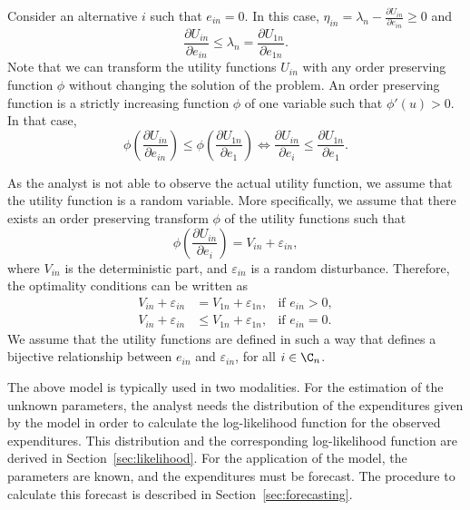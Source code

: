 \documentclass[12pt,a4paper]{article}
\begin{document}
Consider an alternative $i$ such that $e_{in} = 0$. In this case, $\eta_{in}=  \lambda_n- \frac{\partial U_{in}}{\partial e_{in}} \geq 0$ and
\begin{equation}
\label{eq:unchosen}
\frac{\partial U_{in}}{\partial e_{in}}  \leq \lambda_n = \frac{\partial U_{1n}}{\partial e_{1n}}.
\end{equation}
Note that we can transform the utility functions $U_{in}$ with any order preserving function $\phi$
without changing the solution of the problem. An order preserving function is a strictly increasing
function $\phi$ of one variable such that $\phi'(u) > 0$. In that case,
\begin{equation}
\label{eq:phi_transform}
\phi\left(\frac{\partial U_{in}}{\partial e_{in}}\right) \leq \phi\left(\frac{\partial U_{1n}}{\partial e_1}\right) \Longleftrightarrow
\frac{\partial U_{in}}{\partial e_i}  \leq \frac{\partial U_{1n}}{\partial e_1}.
\end{equation}

As the analyst is not able to observe the actual utility function, we  assume that the utility function is a random variable.
More specifically, we assume that there exists an order preserving transform $\phi$ of the utility functions such that
\begin{equation}
\label{eq:utility_def}
\phi\left(\frac{\partial U_{in}}{\partial e_i}\right) = V_{in} + \varepsilon_{in},
\end{equation}
where $V_{in}$ is the deterministic part, and $\varepsilon_{in}$ is a random disturbance. Therefore, the optimality conditions can be written as
\begin{align}
V_{in} + \varepsilon_{in}  &= V_{1n} + \varepsilon_{1n},  & \text{if } e_{in} > 0, \label{eq:non_zero}\\
V_{in} + \varepsilon_{in}  &\leq V_{1n} + \varepsilon_{1n},  & \text{if } e_{in} = 0. \label{eq:zero}
\end{align}
We assume that the utility functions are defined in such a way that
 defines a bijective relationship between $e_{in}$ and
$\varepsilon_{in}$, for all $i\in\C_n$.

The above model is typically used in two modalities. For the estimation of the unknown parameters, the analyst needs
the distribution of the expenditures given by the model in order to calculate the log-likelihood function
for the observed expenditures. This distribution and the corresponding log-likelihood function are derived in
Section~\ref{sec:likelihood}. For the application of the model, the parameters are known, and the expenditures must
be forecast. The procedure to calculate this forecast is described in Section~\ref{sec:forecasting}.
\end{document}
